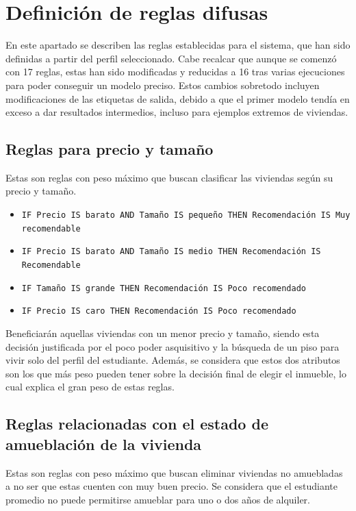 \documentclass[12pt]{report} %
\begin{document}
    \section{Definición de reglas difusas}

    En este apartado se describen las reglas establecidas para el sistema, que
    han sido definidas a partir del perfil seleccionado. Cabe recalcar que
    aunque se comenzó con 17 reglas, estas han sido modificadas y reducidas a
    16 tras varias ejecuciones para poder conseguir un modelo preciso. Estos
    cambios sobretodo incluyen modificaciones de las etiquetas de salida,
    debido a que el primer modelo tendía en exceso a dar resultados intermedios,
    incluso para ejemplos extremos de viviendas.

    \subsection{Reglas para precio y tamaño}
    Estas son reglas con peso máximo que buscan clasificar las viviendas según su precio y tamaño.

    \begin{itemize}
        \item \texttt{IF Precio IS barato AND Tamaño IS pequeño THEN Recomendación IS Muy recomendable}
        \item \texttt{IF Precio IS barato AND Tamaño IS medio THEN Recomendación IS Recomendable}
        \item \texttt{IF Tamaño IS grande THEN Recomendación IS Poco recomendado}
        \item \texttt{IF Precio IS caro THEN Recomendación IS Poco recomendado}
    \end{itemize}

    Beneficiarán aquellas viviendas con un menor precio y tamaño, siendo 
    esta decisión justificada por el poco poder asquisitivo y la búsqueda de un piso para vivir solo
    del perfil del estudiante. Además, se considera que estos dos atributos son los que más peso 
    pueden tener sobre la decisión final de elegir el inmueble, lo cual explica el gran peso de 
    estas reglas.

    \subsection{Reglas relacionadas con el estado de amueblación de la vivienda}
    Estas son reglas con peso máximo que buscan eliminar viviendas no amuebladas a no 
    ser que estas cuenten con muy buen precio. Se considera que el estudiante 
    promedio no puede permitirse amueblar para uno o dos años de alquiler.
\end{document}
